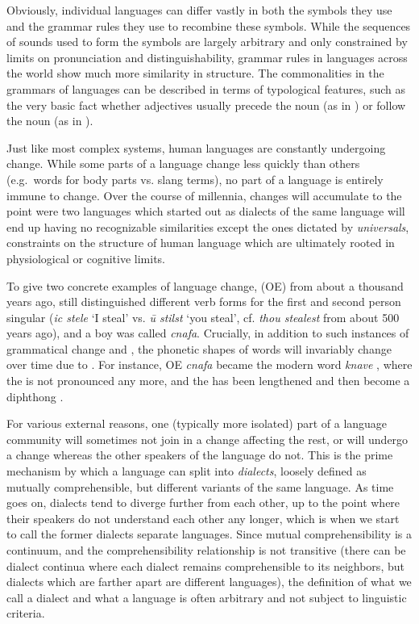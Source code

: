 \newpage 
Obviously, individual languages can differ vastly in both the symbols they use and the grammar rules they use to recombine these symbols. While the sequences of sounds used to form the symbols are largely arbitrary and only constrained by limits on pronunciation and distinguishability, grammar rules in languages across the world show much more similarity in structure. The commonalities in the grammars of languages can be described in terms of typological features, such as the very basic fact whether adjectives usually precede the noun (as in ) or follow the noun (as in ).

Just like most complex systems, human languages are constantly undergoing change. While some parts of a language change less quickly than others (e.g.\ words for body parts vs. slang terms), no part of a language is entirely immune to change. Over the course of millennia, changes will accumulate to the point were two languages which started out as dialects of the same language will end up having no recognizable similarities except the ones dictated by \textit{universals}, constraints on the structure of human language which are ultimately rooted in physiological or cognitive limits.

To give two concrete examples of language change,  (OE) from about a thousand years ago, still distinguished different verb forms for the first and second person singular (\textit{ic stele} `I steal' vs. \textit{\th{}\={u} stilst} `you steal', cf. \textit{thou stealest} from about 500 years ago), and a boy was called \textit{cnafa}. Crucially, in addition to such instances of grammatical change and , the phonetic shapes of words will invariably change over time due to . For instance, OE \textit{cnafa} \UIPA{[knɑvɑ]} became the modern word \textit{knave} \UIPA{[neɪv]}, where the \UIPA{[k]} is not pronounced any more, and the \UIPA{[ɑ]} has been lengthened and then become a diphthong \UIPA{[eɪ]}.

For various external reasons, one (typically more isolated) part of a language community will sometimes not join in a change affecting the rest, or will undergo a change whereas the other speakers of the language do not. This is the prime mechanism by which a language can split into \textit{dialects}, loosely defined as mutually comprehensible, but different variants of the same language. As time goes on, dialects tend to diverge further from each other, up to the point where their speakers do not understand each other any longer, which is when we start to call the former dialects separate languages. Since mutual comprehensibility is a continuum, and the comprehensibility relationship is not transitive (there can be dialect continua where each dialect remains comprehensible to its neighbors, but dialects which are farther apart are different languages), the definition of what we call a dialect and what a language is often arbitrary and not subject to linguistic criteria.

